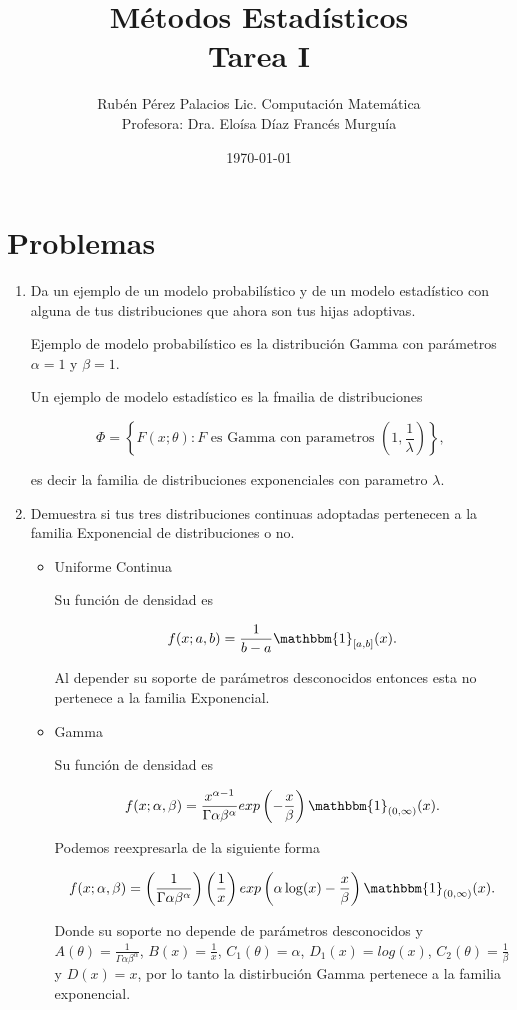 \documentclass[letterpaper]{article}
\title{Métodos Estadísticos \\Tarea I}
\author{Rubén Pérez Palacios Lic. Computación Matemática\\Profesora: Dra. Eloísa Díaz Francés Murguía}
\date{\today}
\theoremstyle{definition}
\theoremstyle{lemathm}
\theoremstyle{lemathm}
\theoremstyle{lemathm}
\theoremstyle{lemademthm}
\newcommand{\pars}[1]{\left( #1 \right) }
\newcommand{\bracs}[1]{\left[ #1 \right] }
\newcommand{\set}[1]{\left \{ #1 \right\} }
\newcommand{\1}{\mathbbm{1}}
\begin{document}
	\maketitle
    
    \section*{Problemas}

	\begin{enumerate}
		\item Da un ejemplo de un modelo probabilístico y de un modelo estadístico con alguna de tus distribuciones que ahora son tus hijas adoptivas.
		
		Ejemplo de modelo probabilístico es la distribución Gamma con parámetros $\alpha = 1$ y $\beta = 1$. 
		
		Un ejemplo de modelo estadístico es la fmailia de distribuciones 
		
		\[\Phi = \set{F(x;\theta) : F \text{ es Gamma con parametros $(1,\frac{1}{\lambda})$}},\]
		
		es decir la familia de distribuciones exponenciales con parametro $\lambda$.

		\item Demuestra si tus tres distribuciones continuas adoptadas pertenecen a la familia Exponencial de distribuciones o no.
		
		\begin{itemize}
			\item Uniforme Continua
			
			Su función de densidad es

			\[f(x; a,b) = \frac{1}{b-a} \1_{\bracs{a,b}}(x).\]

			Al depender su soporte de parámetros desconocidos entonces esta no pertenece a la familia Exponencial.

			\item Gamma
			
			Su función de densidad es

			\[f(x;\alpha,\beta) = \frac{x^{\alpha-1}}{\Gamma{\alpha}\beta^{\alpha}} exp\pars{-\frac{x}{\beta}} \1_{(0,\infty)}(x).\]

			Podemos reexpresarla de la siguiente forma

			\[f(x;\alpha,\beta) = \pars{\frac{1}{\Gamma{\alpha}\beta^{\alpha}}} \pars{\frac{1}{x}} exp\pars{\alpha\log(x)-\frac{x}{\beta}} \1_{(0,\infty)}(x).\]

			Donde su soporte no depende de parámetros desconocidos y $A(\theta) = \frac{1}{\Gamma{\alpha}\beta^{\alpha}}$, $B(x) = \frac{1}{x}$, $C_1(\theta) = \alpha$, $D_1(x) = log(x)$, $C_2(\theta) = \frac{1}{\beta}$ y $D(x) = x$, por lo tanto la distirbución Gamma pertenece a la familia exponencial.


\end{itemize}
\end{enumerate}
\end{document}
